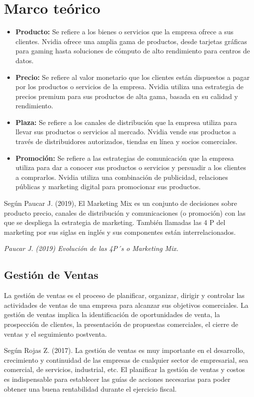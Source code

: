 \documentclass{article}
\newenvironment{marcoTeorico}{\section{Marco teórico}}{}
\begin{document}
\begin{marcoTeorico}
  \begin{itemize}
    \item \textbf{Producto:} Se refiere a los bienes o servicios que la empresa ofrece a sus clientes. Nvidia ofrece una amplia gama de productos, desde tarjetas gráficas para gaming hasta soluciones de cómputo de alto rendimiento para centros de datos.
    \item \textbf{Precio:} Se refiere al valor monetario que los clientes están dispuestos a pagar por los productos o servicios de la empresa. Nvidia utiliza una estrategia de precios premium para sus productos de alta gama, basada en su calidad y rendimiento.
    \item \textbf{Plaza:} Se refiere a los canales de distribución que la empresa utiliza para llevar sus productos o servicios al mercado. Nvidia vende sus productos a través de distribuidores autorizados, tiendas en línea y socios comerciales.
    \item \textbf{Promoción:} Se refiere a las estrategias de comunicación que la empresa utiliza para dar a conocer sus productos o servicios y persuadir a los clientes a comprarlos. Nvidia utiliza una combinación de publicidad, relaciones públicas y marketing digital para promocionar sus productos.
  \end{itemize}

  Según Paucar J. (2019), El Marketing Mix es un conjunto de decisiones sobre producto precio, canales de distribución y comunicaciones (o promoción) con las que se despliega la estrategia de marketing. También llamadas las 4 P del marketing por sus siglas en inglés y sus componentes están interrelacionados.

  \begin{flushright}
    \textit{Paucar J. (2019) Evolución de las 4P´s o Marketing Mix.}
  \end{flushright}  

  \subsection{Gestión de Ventas}

  La gestión de ventas es el proceso de planificar, organizar, dirigir y controlar las actividades de ventas de una empresa para alcanzar sus objetivos comerciales. La gestión de ventas implica la identificación de oportunidades de venta, la prospección de clientes, la presentación de propuestas comerciales, el cierre de ventas y el seguimiento postventa.

  Según Rojas Z. (2017). La gestión de ventas es muy importante en el desarrollo, crecimiento y continuidad de
  las empresas de cualquier sector de empresarial, sea comercial, de servicios, industrial,
  etc. El planificar la gestión de ventas y costos es indispensable para establecer las guías
  de acciones necesarias para poder obtener una buena rentabilidad durante el ejercicio
  fiscal.


\end{marcoTeorico}
\end{document}
